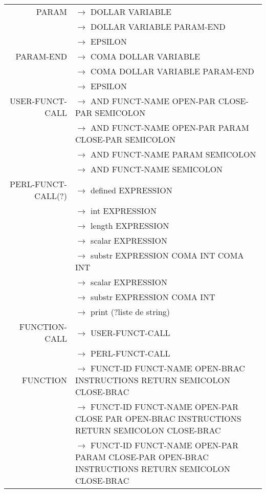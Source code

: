 \documentclass[a4paper,10pt]{article}
\begin{document}
\begin{tabular}{rl}
					
					
PARAM				& $\rightarrow$ DOLLAR VARIABLE \\
					& $\rightarrow$ DOLLAR VARIABLE PARAM-END\\
					& $\rightarrow$ EPSILON \\
PARAM-END			& $\rightarrow$ COMA DOLLAR VARIABLE \\ 
					& $\rightarrow$ COMA DOLLAR VARIABLE PARAM-END\\ 
					& $\rightarrow$ EPSILON \\



USER-FUNCT-CALL		& $\rightarrow$ AND FUNCT-NAME OPEN-PAR CLOSE-PAR SEMICOLON \\ 
					& $\rightarrow$ AND FUNCT-NAME OPEN-PAR PARAM CLOSE-PAR SEMICOLON \\ 
					& $\rightarrow$ AND FUNCT-NAME PARAM SEMICOLON \\ 
					& $\rightarrow$ AND FUNCT-NAME SEMICOLON \\ 
					
					
					
					
PERL-FUNCT-CALL(?)	& $\rightarrow$ defined EXPRESSION \\
					& $\rightarrow$ int EXPRESSION \\
					& $\rightarrow$ length EXPRESSION \\ 
					& $\rightarrow$ scalar EXPRESSION \\
					& $\rightarrow$ substr EXPRESSION COMA INT COMA INT \\
					& $\rightarrow$ scalar EXPRESSION \\
					& $\rightarrow$ substr EXPRESSION COMA INT  \\
					& $\rightarrow$ print (?liste de string) \\ 
					
					
FUNCTION-CALL		& $\rightarrow$ USER-FUNCT-CALL \\
					& $\rightarrow$ PERL-FUNCT-CALL \\


FUNCTION			& $\rightarrow$ FUNCT-ID FUNCT-NAME OPEN-BRAC INSTRUCTIONS RETURN SEMICOLON CLOSE-BRAC \\
					& $\rightarrow$ FUNCT-ID FUNCT-NAME OPEN-PAR CLOSE PAR OPEN-BRAC INSTRUCTIONS RETURN SEMICOLON CLOSE-BRAC \\
					& $\rightarrow$ FUNCT-ID FUNCT-NAME OPEN-PAR PARAM CLOSE-PAR OPEN-BRAC INSTRUCTIONS RETURN SEMICOLON CLOSE-BRAC \\


\end{tabular}
\end{document}
